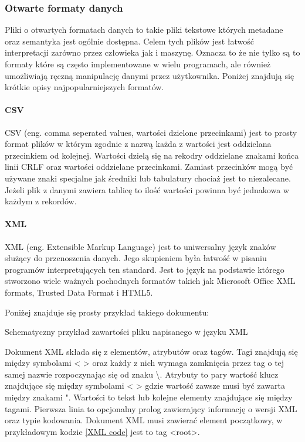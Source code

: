 \documentclass[a4paper,12pt]{article}
\begin{document}
\subsubsection{Otwarte formaty danych}

Pliki o otwartych formatach danych to takie pliki tekstowe których metadane oraz semantyka jest ogólnie dostępna. 
Celem tych plików jest łatwość interpretacji zarówno przez człowieka jak i maszynę. 
Oznacza to że nie tylko są to formaty które są często implementowane w wielu programach, ale również umożliwiają ręczną manipulację danymi przez użytkownika.  
Poniżej znajdują się krótkie opisy najpopularniejszych formatów.

\paragraph{CSV}
CSV (eng. comma seperated values, wartości dzielone przecinkami) jest to prosty format plików w którym zgodnie z nazwą każda z wartości jest oddzielana przecinkiem od kolejnej. Wartości dzielą się na rekodry oddzielane znakami końca linii CRLF oraz wartości oddzielane przecinkami. Zamiast przecinków mogą być używane znaki specjalne jak średniki lub tabulatury chociaż jest to niezalecane. Jeżeli plik z danymi zawiera tablicę to ilość wartości powinna być jednakowa w każdym z rekordów. 

\paragraph{XML}

XML (eng. Extensible Markup Language) jest to uniwersalny język znaków służący do przenoszenia danych. Jego skupieniem była łatwość w pisaniu programów interpretujących ten standard.
Jest to język na podstawie którego stworzono wiele ważnych pochodnych formatów takich jak Microsoft Office XML formats, Trusted Data Format i HTML5.

Poniżej znajduje się prosty przykład takiego dokumentu:
\begin{kod}
        
        \caption{Schematyczny przykład zawartości pliku napisanego w języku XML}
        \label{XML code}
\end{kod}

Dokument XML składa się z elementów, atrybutów oraz tagów. 
Tagi znajdują się między symbolami < > oraz każdy z nich wymaga zamknięcia przez tag o tej samej nazwie rozpoczynając się od znaku \textbackslash.
Atrybuty to pary wartość klucz znajdujące się między symbolami < > gdzie wartość zawsze musi być zawarta między znakami ".
Wartości to tekst lub kolejne elementy znajdujące się między tagami. 
Pierwsza linia to opcjonalny prolog zawierający informację o wersji XML oraz typie kodowania.  
Dokument XML musi zawierać element początkowy, w przykładowym kodzie \ref{XML code} jest to tag <root>.
\end{document}

